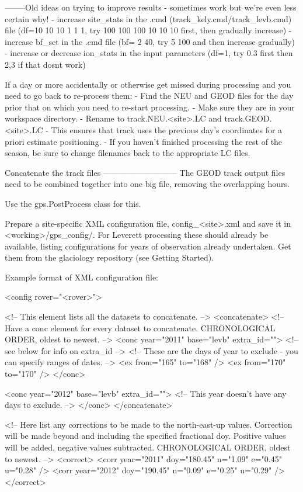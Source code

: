 \documentclass[11pt]{article} %
\begin{document}
--------Old ideas on trying to improve results - sometimes work but we're even less certain why!
	- increase site_stats in the .cmd (track_kely.cmd/track_levb.cmd) file (df=10 10 10 1 1 1, try 100 100 100 10 10 10 first, then gradually increase)
	- increase bf_set in the .cmd file (bf= 2 40, try 5 100 and then increase gradually)
	- increase or decrease ion_stats in the input parameters (df=1, try 0.3 first then 2,3 if that dosnt work)
	
	
If a day or more accidentally or otherwise get missed during processing and you need to go back to re-process them:
- Find the NEU and GEOD files for the day prior that on which you need to re-start processing.
- Make sure they are in your workspace directory.
- Rename to track.NEU.<site>.LC and track.GEOD.<site>.LC
- This ensures that track uses the previous day's coordinates for a priori estimate positioning.
- If you haven't finished processing the rest of the season, be sure to change filenames back to the appropriate LC files.
	
Concatenate the track files
---------------------------
The GEOD track output files need to be combined together into one big file, removing the overlapping hours.

Use the gps.PostProcess class for this.

Prepare a site-specific XML configuration file, config_<site>.xml and save it in <working>/gps_config/.
For Leverett processing these should already be available, listing configurations for years of observation  already undertaken. Get them from the glaciology repository (see Getting Started).


Example format of XML configuration file:

<config rover="<rover>">

	<!-- This element lists all the datasets to concatenate. -->
	<concatenate>
		<!-- Have a conc element for every dataset to concatenate. 
		CHRONOLOGICAL ORDER, oldest to newest. -->
		<conc year="2011" base="levb" extra_id=""> <!-- see below for info on extra_id -->
			<!-- These are the days of year to exclude - you can specify ranges of dates. -->
			<ex from="165" to="168" />
			<ex from="170" to="170" />
		</conc>
		
		<conc year="2012" base="levb" extra_id="">
		<!-- This year doesn't have any days to exclude. -->
		</conc>
	</concatenate>

	<!-- Here list any corrections to be made to the north-east-up values.
		Correction will be made beyond and including the specified fractional doy.
		Positive values will be added, negative values subtracted.
		 CHRONOLOGICAL ORDER, oldest to newest. -->
	<correct>
		<corr year="2011" doy="180.45" n="1.09" e="0.45" u="0.28" />
		<corr year="2012" doy="190.45" n="0.09" e="0.25" u="0.29" />
	</correct>
\end{document}
